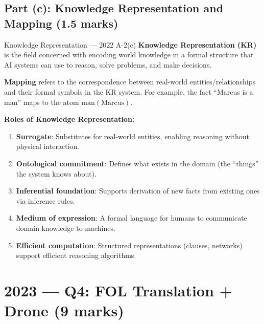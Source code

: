 \documentclass[12pt,a4paper]{article}
\begin{document}
\subsection{Part (c): Knowledge Representation and Mapping (1.5 marks)}

\begin{solbox}{Knowledge Representation --- 2022 A-2(c)}
\textbf{Knowledge Representation (KR)} is the field concerned with encoding world knowledge in a formal structure that AI systems can use to reason, solve problems, and make decisions.

\textbf{Mapping} refers to the correspondence between real-world entities/relationships and their formal symbols in the KR system. For example, the fact ``Marcus is a man'' maps to the atom $\mathrm{man(Marcus)}$.

\textbf{Roles of Knowledge Representation:}
\begin{enumerate}[noitemsep]
  \item \textbf{Surrogate}: Substitutes for real-world entities, enabling reasoning without physical interaction.
  \item \textbf{Ontological commitment}: Defines what exists in the domain (the ``things'' the system knows about).
  \item \textbf{Inferential foundation}: Supports derivation of new facts from existing ones via inference rules.
  \item \textbf{Medium of expression}: A formal language for humans to communicate domain knowledge to machines.
  \item \textbf{Efficient computation}: Structured representations (clauses, networks) support efficient reasoning algorithms.
\end{enumerate}
\end{solbox}

\newpage
\section{2023 --- Q4: FOL Translation + Drone (9 marks)}
\end{document}
